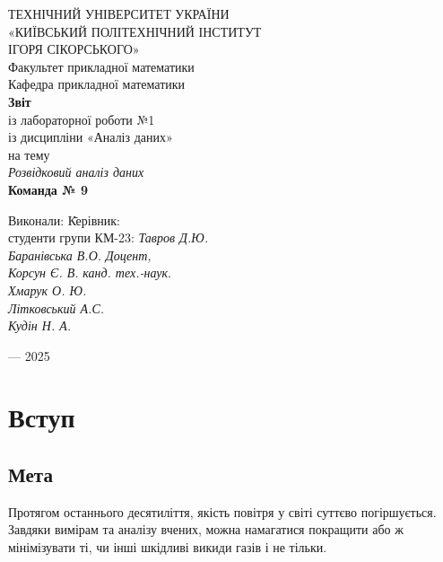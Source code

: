 \documentclass{article}
\begin{document}
\newpage 
\begin{center}
     ТЕХНІЧНИЙ УНІВЕРСИТЕТ УКРАЇНИ\\
    \Large«КИЇВСЬКИЙ ПОЛІТЕХНІЧНИЙ ІНСТИТУТ\\
     ІГОРЯ СІКОРСЬКОГО»\\
    \vspace{1cm}
    Факультет прикладної математики\\
    Кафедра прикладної математики\\
    \vspace{3cm}
    \textbf{Звіт}\\
    \vspace{0.5cm}
    із лабораторної роботи №1\\
    із дисципліни «Аналіз даних»\\
    \vspace{1cm}
    на тему\\
    \textit{Розвідковий аналіз даних}\\
    \vspace{1.5cm}
    \textbf{Команда № 9}\\
    \vspace{2cm}
    \begin{tabbing}
        Виконали: \hspace{10cm} \= Керівник:\\
        студенти групи КМ-23: \> \textit{Тавров Д.Ю.}\\
        \textit{Баранівська В.О.} \> \textit{Доцент,}\\
        \textit{Корсун Є. В.} \> \textit{канд. тех.-наук}.\\
        \textit{Хмарук О. Ю.} \> \\
        \textit{Літковський А.С.} \>\\
        \textit{Кудін Н. А.} \> \\
    \end{tabbing}
    \vspace{3cm}
     — 2025\\
\end{center}

\newpage
\hypertarget{mytarget}{} %
\tableofcontents
\newpage

\section{Вступ}
\subsection{Мета}
Протягом останнього десятиліття, якість повітря у світі суттєво погіршується. Завдяки вимірам та аналізу вчених, можна намагатися покращити або ж мінімізувати ті, чи інші шкідливі викиди газів і не тільки. 
\end{document}
